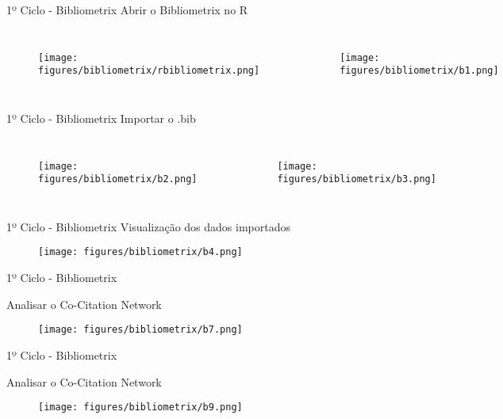 \begin{frame}{1º Ciclo - Bibliometrix}
	Abrir o Bibliometrix no R
	\begin{columns}
		\begin{figure}[hb]
			\texttt{[image: figures/bibliometrix/rbibliometrix.png]}
		\end{figure}
		\begin{figure}[hb]
			\texttt{[image: figures/bibliometrix/b1.png]}
		\end{figure}
	\end{columns}
\end{frame}

\begin{frame}{1º Ciclo - Bibliometrix}
	Importar o .bib
	\begin{columns}
		\column{.5\textwidth}
		\begin{figure}[hb]
			\texttt{[image: figures/bibliometrix/b2.png]}
		\end{figure}
		\column{.5\textwidth}
		\begin{figure}[hb]
			\texttt{[image: figures/bibliometrix/b3.png]}
		\end{figure}
	\end{columns}
\end{frame}

\begin{frame}{1º Ciclo - Bibliometrix}
	Visualização dos dados importados
	\begin{figure}[hb]
		\texttt{[image: figures/bibliometrix/b4.png]}
	\end{figure}
\end{frame}

\begin{frame}{1º Ciclo - Bibliometrix}

	Analisar o Co-Citation Network
	\begin{figure}[hb]
		\texttt{[image: figures/bibliometrix/b7.png]}
	\end{figure}
\end{frame}

\begin{frame}{1º Ciclo - Bibliometrix}

	Analisar o Co-Citation Network
	\begin{figure}[hb]
		\texttt{[image: figures/bibliometrix/b9.png]}
	\end{figure}
\end{frame}

